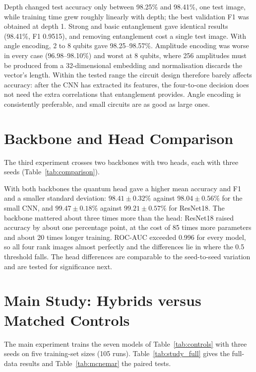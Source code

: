 Depth changed test accuracy only between 98.25\% and 98.41\%, one test
image, while training time grew roughly linearly with depth; the best
validation F1 was obtained at depth 1. Strong and basic entanglement gave
identical results (98.41\%, F1 0.9515), and removing entanglement cost a
single test image. With angle encoding, 2 to 8 qubits gave 98.25--98.57\%.
Amplitude encoding was worse in every case (96.98--98.10\%) and worst at 8
qubits, where 256 amplitudes must be produced from a 32-dimensional
embedding and normalisation discards the vector's length. Within the tested
range the circuit design therefore barely affects accuracy: after the CNN
has extracted its features, the four-to-one decision does not need the
extra correlations that entanglement provides. Angle encoding is
consistently preferable, and small circuits are as good as large ones.

\section{Backbone and Head Comparison}
\label{sec:res_backbone}
The third experiment crosses two backbones with two heads, each with three
seeds (Table~\ref{tab:comparison}).



With both backbones the quantum head gave a higher mean accuracy and F1 and
a smaller standard deviation: $98.41 \pm 0.32\%$ against $98.04 \pm 0.56\%$
for the small CNN, and $99.47 \pm 0.18\%$ against $99.21 \pm 0.57\%$ for
ResNet18. The backbone mattered about three times more than the head:
ResNet18 raised accuracy by about one percentage point, at the cost of 85
times more parameters and about 20 times longer training. ROC-AUC exceeded
0.996 for every model, so all four rank images almost perfectly and the
differences lie in where the 0.5 threshold falls. The head differences are
comparable to the seed-to-seed variation and are tested for significance
next.

\section{Main Study: Hybrids versus Matched Controls}
\label{sec:res_study}
The main experiment trains the seven models of Table~\ref{tab:controls}
with three seeds on five training-set sizes (105 runs).
Table~\ref{tab:study_full} gives the full-data results and
Table~\ref{tab:mcnemar} the paired tests.




